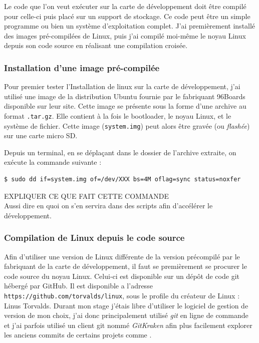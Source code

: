 Le code que l'on veut exécuter sur la carte de développement doit être compilé pour celle-ci puis placé sur un support de stockage. Ce code peut être un simple programme ou bien un système d'exploitation complet. J'ai premièrement installé des images pré-compilées de Linux, puis j'ai compilé moi-même le noyau Linux depuis son code source en réalisant une compilation croisée.

\subsubsection{Installation d'une image pré-compilée}

Pour premier tester l'Installation de linux sur la carte de développement, j'ai utilisé une image de la distribution Ubuntu fournie par le fabriquant 96Boards disponible sur leur site. Cette image se présente sous la forme d'une archive au format \texttt{.tar.gz}. Elle contient à la fois le \gls{bootloader}, le noyau Linux, et le système de fichier. Cette image (\texttt{system.img}) peut alors être gravée (ou \textit{flashée}) sur une carte micro SD. 

Depuis un terminal, en se déplaçant dans le dossier de l'archive extraite, on exécute la commande suivante : 
\begin{lstlisting}[style=command]
$ sudo dd if=system.img of=/dev/XXX bs=4M oflag=sync status=noxfer
\end{lstlisting}

\begin{center}
    \color{red}
    EXPLIQUER CE QUE FAIT CETTE COMMANDE \\
    Aussi dire en quoi on s'en servira dans des scripts afin d'accélérer le développement.
\end{center}


\subsubsection{Compilation de Linux depuis le code source}\label{sec:compilation-linux-source}

Afin d'utiliser une version de Linux différente de la version précompilé par le fabriquant de la carte de développement, il faut se premièrement se procurer le code source du noyau Linux. Celui-ci est disponible sur un dépôt de code \gls{git} hébergé par GitHub. Il est disponible a l'adresse \texttt{https://github.com/torvalds/linux}, sous le profile du créateur de Linux : Linus Torvalds. Durant mon stage j'étais libre d'utiliser le logiciel de gestion de version de mon choix, j'ai donc principalement utilisé \textit{git} en ligne de commande et j'ai parfois utilisé un client git nommé \textit{GitKraken} afin plus facilement explorer les anciens commits de certains projets comme \litmus.

